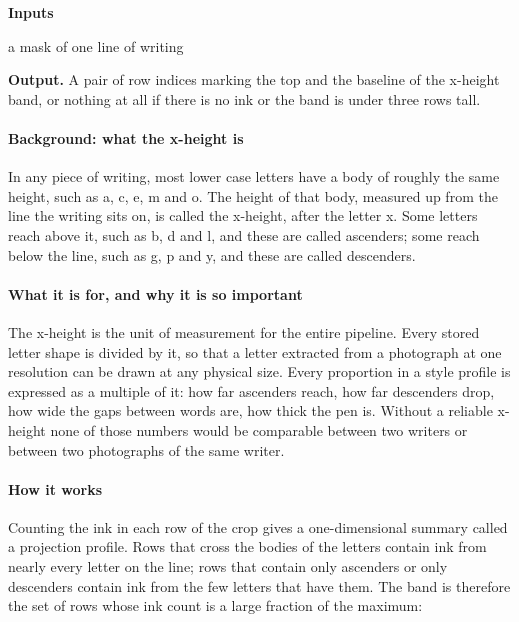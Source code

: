 \noindent\textbf{Inputs}
\begin{description}[leftmargin=2.2em,style=nextline,font=\normalfont\ttfamily]\setlength\itemsep{1pt}
  \item[{ink}] \normalfont a mask of one line of writing
\end{description}

\noindent\textbf{Output.} A pair of row indices marking the top and the baseline of the x-height band, or nothing at all if there is no ink or the band is under three rows tall.


\paragraph{Background: what the x-height is}
In any piece of writing, most lower case letters have a body of roughly the same height, such as a, c, e, m and o. The height of that body, measured up from the line the writing sits on, is called the x-height, after the letter x. Some letters reach above it, such as b, d and l, and these are called ascenders; some reach below the line, such as g, p and y, and these are called descenders.


\paragraph{What it is for, and why it is so important}
The x-height is the unit of measurement for the entire pipeline. Every stored letter shape is divided by it, so that a letter extracted from a photograph at one resolution can be drawn at any physical size. Every proportion in a style profile is expressed as a multiple of it: how far ascenders reach, how far descenders drop, how wide the gaps between words are, how thick the pen is. Without a reliable x-height none of those numbers would be comparable between two writers or between two photographs of the same writer.


\paragraph{How it works}
Counting the ink in each row of the crop gives a one-dimensional summary called a projection profile. Rows that cross the bodies of the letters contain ink from nearly every letter on the line; rows that contain only ascenders or only descenders contain ink from the few letters that have them. The band is therefore the set of rows whose ink count is a large fraction of the maximum:


